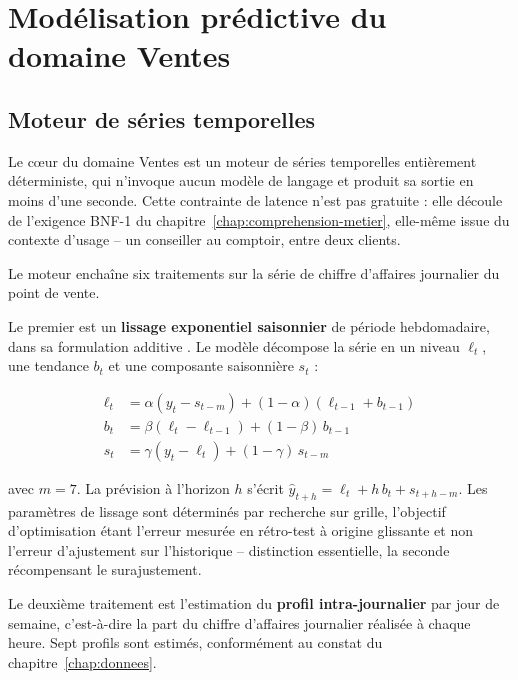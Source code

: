 \section{Modélisation prédictive du domaine Ventes}
\label{sec:modele-ca}

\subsection{Moteur de séries temporelles}

Le cœur du domaine Ventes est un moteur de séries temporelles entièrement déterministe, qui n'invoque aucun modèle de langage et produit sa sortie en moins d'une seconde. Cette contrainte de latence n'est pas gratuite : elle découle de l'exigence BNF-1 du chapitre~\ref{chap:comprehension-metier}, elle-même issue du contexte d'usage -- un conseiller au comptoir, entre deux clients.

Le moteur enchaîne six traitements sur la série de chiffre d'affaires journalier du point de vente.

Le premier est un \textbf{lissage exponentiel saisonnier} de période hebdomadaire, dans sa formulation additive \cite{holt2004forecasting,winters1960forecasting}. Le modèle décompose la série en un niveau $\ell_t$, une tendance $b_t$ et une composante saisonnière $s_t$ :

\begin{align}
\ell_t &= \alpha \left( y_t - s_{t-m} \right) + (1-\alpha)\left( \ell_{t-1} + b_{t-1} \right) \\
b_t &= \beta \left( \ell_t - \ell_{t-1} \right) + (1-\beta)\, b_{t-1} \\
s_t &= \gamma \left( y_t - \ell_t \right) + (1-\gamma)\, s_{t-m}
\end{align}

avec $m = 7$. La prévision à l'horizon $h$ s'écrit $\hat{y}_{t+h} = \ell_t + h\,b_t + s_{t+h-m}$. Les paramètres de lissage sont déterminés par recherche sur grille, l'objectif d'optimisation étant l'erreur mesurée en rétro-test à origine glissante et non l'erreur d'ajustement sur l'historique -- distinction essentielle, la seconde récompensant le surajustement.

Le deuxième traitement est l'estimation du \textbf{profil intra-journalier} par jour de semaine, c'est-à-dire la part du chiffre d'affaires journalier réalisée à chaque heure. Sept profils sont estimés, conformément au constat du chapitre~\ref{chap:donnees}.

